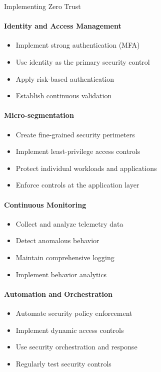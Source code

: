 \begin{KR}{Implementing Zero Trust}\\
\paragraph{Identity and Access Management}
\begin{itemize}
    \item Implement strong authentication (MFA)
    \item Use identity as the primary security control
    \item Apply risk-based authentication
    \item Establish continuous validation
\end{itemize}

\paragraph{Micro-segmentation}
\begin{itemize}
    \item Create fine-grained security perimeters
    \item Implement least-privilege access controls
    \item Protect individual workloads and applications
    \item Enforce controls at the application layer
\end{itemize}

\paragraph{Continuous Monitoring}
\begin{itemize}
    \item Collect and analyze telemetry data
    \item Detect anomalous behavior
    \item Maintain comprehensive logging
    \item Implement behavior analytics
\end{itemize}

\paragraph{Automation and Orchestration}
\begin{itemize}
    \item Automate security policy enforcement
    \item Implement dynamic access controls
    \item Use security orchestration and response
    \item Regularly test security controls
\end{itemize}
\end{KR}

